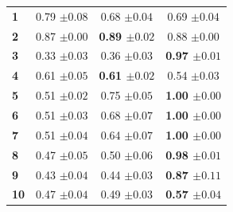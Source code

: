 \begin{table}[htbp]
\begin{tabular}{p{7cm}cccccc}
      \midrule
\bfseries 1 \dotfill & \multicolumn{2}{c}{0.79 ${\scriptscriptstyle \pm 0.08}$} & \multicolumn{2}{c}{0.68 ${\scriptscriptstyle \pm 0.04}$} & \multicolumn{2}{c}{0.69 ${\scriptscriptstyle \pm 0.04}$} \\
\bfseries 2 \dotfill & \multicolumn{2}{c}{0.87 ${\scriptscriptstyle \pm 0.00}$} & \multicolumn{2}{c}{\bfseries 0.89 ${\scriptscriptstyle \pm 0.02}$} & \multicolumn{2}{c}{0.88 ${\scriptscriptstyle \pm 0.00}$}\\
\bfseries 3 \dotfill& \multicolumn{2}{c}{0.33 ${\scriptscriptstyle \pm 0.03}$} & \multicolumn{2}{c}{0.36 ${\scriptscriptstyle \pm 0.03}$} &
                                                                            \multicolumn{2}{c}{\bfseries 0.97 ${\scriptscriptstyle \pm 0.01}$} \\
 \bfseries 4  \dotfill    & \multicolumn{2}{c}{0.61 ${\scriptscriptstyle \pm 0.05}$} & \multicolumn{2}{c}{\bfseries 0.61
                                              ${\scriptscriptstyle \pm 0.02}$} &
                                                                              \multicolumn{2}{c}{0.54
                                                                               ${\scriptscriptstyle \pm 0.03}$} \\
 \bfseries 5  \dotfill    & \multicolumn{2}{c}{0.51 ${\scriptscriptstyle \pm 0.02}$} & \multicolumn{2}{c}{0.75 ${\scriptscriptstyle \pm 0.05}$} & \multicolumn{2}{c}{\bfseries 1.00 ${\scriptscriptstyle \pm 0.00}$} \\
      \bfseries 6 \dotfill     & \multicolumn{2}{c}{0.51 ${\scriptscriptstyle \pm 0.03}$} &
                            \multicolumn{2}{c}{0.68 ${\scriptscriptstyle \pm 0.07}$} &
                              \multicolumn{2}{c}{\bfseries 1.00 ${\scriptscriptstyle \pm 0.00}$} \\
   \bfseries 7  \dotfill  & \multicolumn{2}{c}{0.51 ${\scriptscriptstyle \pm 0.04}$} & \multicolumn{2}{c}{0.64 ${\scriptscriptstyle \pm 0.07}$}
                                    & \multicolumn{2}{c}{\bfseries 1.00
                                      ${\scriptscriptstyle \pm 0.00}$}  \\
 \bfseries 8 \dotfill & \multicolumn{2}{c}{0.47 ${\scriptscriptstyle \pm 0.05}$} & \multicolumn{2}{c}{0.50 ${\scriptscriptstyle \pm 0.06}$} &
                                                                             \multicolumn{2}{c}{\bfseries 0.98 ${\scriptscriptstyle \pm 0.01}$}  \\
      \bfseries 9 \dotfill & \multicolumn{2}{c}{0.43 ${\scriptscriptstyle \pm 0.04}$} &
                                    \multicolumn{2}{c}{0.44 ${\scriptscriptstyle \pm 0.03}$}
                                    & \multicolumn{2}{c}{\bfseries 0.87 ${\scriptscriptstyle \pm 0.11}$}   \\
\bfseries 10  \dotfill     & \multicolumn{2}{c}{0.47 ${\scriptscriptstyle \pm 0.04}$} & \multicolumn{2}{c}{0.49 ${\scriptscriptstyle \pm 0.03}$} & \multicolumn{2}{c}{\bfseries 0.57 ${\scriptscriptstyle \pm 0.04}$} \\


\end{tabular}
\end{table}
